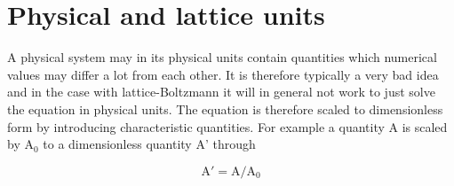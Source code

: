 \section{Physical and lattice units}

A physical system may in its physical units contain quantities which
numerical values may differ a lot from each other. It is therefore
typically a very bad idea and in the case with lattice-Boltzmann it
will in general not work to just solve the equation in physical
units. The equation is therefore scaled to dimensionless form by
introducing characteristic quantities. For example a quantity A is
scaled by A$_0$ to a dimensionless quantity A' through

\begin{equation}
\mathrm{A}' = \mathrm{A}/\mathrm{A_0} 
\end{equation}

